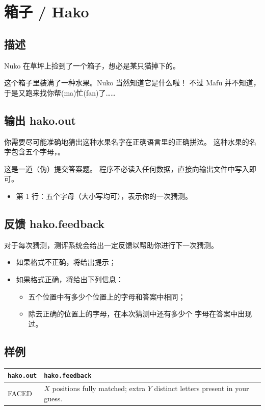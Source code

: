 \documentclass[UTF8, 11pt, a4paper]{article}
\begin{document}
\section*{箱子 / Hako}

\subsection*{描述}
Nuko 在草坪上捡到了一个箱子，想必是某只猫掉下的。

这个箱子里装满了一种水果。Nuko 当然知道它是什么啦！%
不过 Mafu 并不知道，于是又跑来找你帮(ma)忙(fan)了……

\subsection*{输出 \makebox[0.5em]{} \small{hako.out}}
你需要尽可能准确地猜出这种水果名字在正确语言里的正确拼法。%
这种水果的名字包含五个字母，。

这是一道（伪）提交答案题。%
程序不必读入任何数据，直接向输出文件中写入即可。

\begin{itemize}
    \item 第 1 行：五个字母（大小写均可），表示你的一次猜测。
\end{itemize}

\subsection*{反馈 \makebox[0.5em]{} \small{hako.feedback}}
对于每次猜测，测评系统会给出一定反馈以帮助你进行下一次猜测。
\begin{itemize}
    \item 如果格式不正确，将给出提示；
    \item 如果格式正确，将给出下列信息：
    \begin{itemize}
        \item 五个位置中有多少个位置上的字母和答案中相同；
        \item 除去正确的位置上的字母，在本次猜测中还有多少个%
            字母在答案中出现过。
    \end{itemize}
\end{itemize}

\subsection*{样例}
\begin{table}[h]\centering
\begin{tabularx}{0.8 \textwidth}{|X|X|}
\hline
\texttt{\textbf{hako.out}} & \texttt{\textbf{hako.feedback}} \\ \hline
{\ttfamily
FACED
} & {\ttfamily
$X$ positions fully matched;\newline
extra $Y$ distinct letters present in your guess.
}
\\ \hline
\end{tabularx}\end{table}
\end{document}

